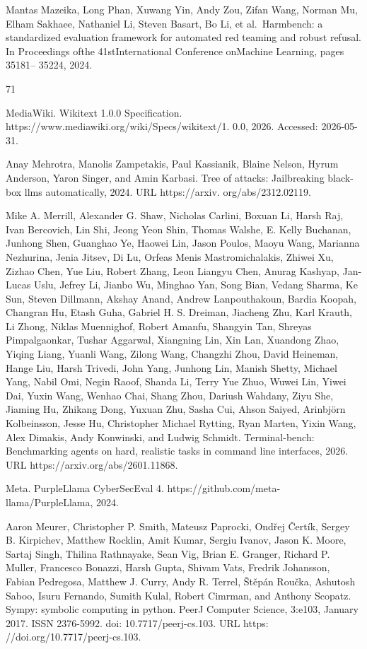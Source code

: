 \documentclass[
  10
]{article}
\begin{document}
Mantas Mazeika, Long Phan, Xuwang Yin, Andy Zou, Zifan Wang, Norman Mu,
Elham Sakhaee, Nathaniel Li, Steven Basart, Bo Li, et al.~Harmbench: a
standardized evaluation framework for automated red teaming and robust
refusal. In Proceedings ofthe 41stInternational Conference onMachine
Learning, pages 35181-- 35224, 2024.

71

MediaWiki. Wikitext 1.0.0 Specification.
https://www.mediawiki.org/wiki/Specs/wikitext/1. 0.0, 2026. Accessed:
2026-05-31.

Anay Mehrotra, Manolis Zampetakis, Paul Kassianik, Blaine Nelson, Hyrum
Anderson, Yaron Singer, and Amin Karbasi. Tree of attacks: Jailbreaking
black-box llms automatically, 2024. URL https://arxiv.
org/abs/2312.02119.

Mike A. Merrill, Alexander G. Shaw, Nicholas Carlini, Boxuan Li, Harsh
Raj, Ivan Bercovich, Lin Shi, Jeong Yeon Shin, Thomas Walshe, E. Kelly
Buchanan, Junhong Shen, Guanghao Ye, Haowei Lin, Jason Poulos, Maoyu
Wang, Marianna Nezhurina, Jenia Jitsev, Di Lu, Orfeas Menis
Mastromichalakis, Zhiwei Xu, Zizhao Chen, Yue Liu, Robert Zhang, Leon
Liangyu Chen, Anurag Kashyap, Jan-Lucas Uslu, Jefrey Li, Jianbo Wu,
Minghao Yan, Song Bian, Vedang Sharma, Ke Sun, Steven Dillmann, Akshay
Anand, Andrew Lanpouthakoun, Bardia Koopah, Changran Hu, Etash Guha,
Gabriel H. S. Dreiman, Jiacheng Zhu, Karl Krauth, Li Zhong, Niklas
Muennighof, Robert Amanfu, Shangyin Tan, Shreyas Pimpalgaonkar, Tushar
Aggarwal, Xiangning Lin, Xin Lan, Xuandong Zhao, Yiqing Liang, Yuanli
Wang, Zilong Wang, Changzhi Zhou, David Heineman, Hange Liu, Harsh
Trivedi, John Yang, Junhong Lin, Manish Shetty, Michael Yang, Nabil Omi,
Negin Raoof, Shanda Li, Terry Yue Zhuo, Wuwei Lin, Yiwei Dai, Yuxin
Wang, Wenhao Chai, Shang Zhou, Dariush Wahdany, Ziyu She, Jiaming Hu,
Zhikang Dong, Yuxuan Zhu, Sasha Cui, Ahson Saiyed, Arinbjörn
Kolbeinsson, Jesse Hu, Christopher Michael Rytting, Ryan Marten, Yixin
Wang, Alex Dimakis, Andy Konwinski, and Ludwig Schmidt. Terminal-bench:
Benchmarking agents on hard, realistic tasks in command line interfaces,
2026. URL https://arxiv.org/abs/2601.11868.

Meta. PurpleLlama CyberSecEval 4.
https://github.com/meta-llama/PurpleLlama, 2024.

Aaron Meurer, Christopher P. Smith, Mateusz Paprocki, Ondřej Čertík,
Sergey B. Kirpichev, Matthew Rocklin, Amit Kumar, Sergiu Ivanov, Jason
K. Moore, Sartaj Singh, Thilina Rathnayake, Sean Vig, Brian E. Granger,
Richard P. Muller, Francesco Bonazzi, Harsh Gupta, Shivam Vats, Fredrik
Johansson, Fabian Pedregosa, Matthew J. Curry, Andy R. Terrel, Štěpán
Roučka, Ashutosh Saboo, Isuru Fernando, Sumith Kulal, Robert Cimrman,
and Anthony Scopatz. Sympy: symbolic computing in python. PeerJ Computer
Science, 3:e103, January 2017. ISSN 2376-5992. doi:
10.7717/peerj-cs.103. URL https: //doi.org/10.7717/peerj-cs.103.
\end{document}
